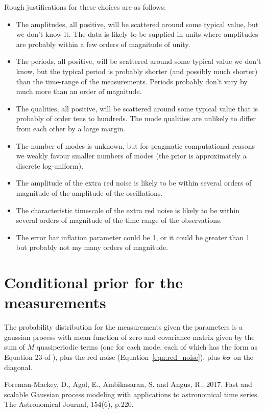 \documentclass[a4paper, 12pt]{article}
\begin{document}
Rough justifications for these choices are as follows:
\begin{itemize}
    \item The amplitudes, all positive, will be scattered around some typical
          value, but we don't know it. The data is likely to be supplied
          in units where amplitudes are probably
          within a few orders of magnitude of unity.
    \item The periods, all positive, will be scattered around some typical
          value we don't know, but the typical period is probably shorter
          (and possibly much shorter) than the time-range of the measurements.
          Periods probably don't vary by much more than an order of magnitude.
    \item The qualities, all positive, will be scattered around some typical
          value that is probably of order tens to hundreds. The mode qualities
          are unlikely to differ from each other by a large margin.
    \item The number of modes is unknown, but for pragmatic computational
          reasons we weakly favour smaller numbers of modes (the prior
          is approximately a discrete log-uniform).
    \item The amplitude of the extra red noise is likely to be within
          several orders of magnitude of the amplitude of the oscillations.
    \item The characteristic timescale of the extra red noise is likely to
          be within several orders of magnitude of the time range of the
          observations.
    \item The error bar inflation parameter could be 1, or it could be
          greater than 1 but probably not my many orders of magnitude.
\end{itemize}

\section{Conditional prior for the measurements}

The probability distribution for the measurements given the parameters is
a gaussian process with mean function of zero and covariance matrix given
by the sum of $M$ quasiperiodic terms (one for each mode, each of which
has the form as Equation 23 of \citet{celerite}), plus the red noise
(Equation~\ref{eqn:red_noise}), plus $k\boldsymbol{\sigma}$ on the diagonal.

\begin{thebibliography}{999}
Foreman-Mackey, D., Agol, E., Ambikasaran, S. and Angus, R., 2017. Fast and scalable Gaussian process modeling with applications to astronomical time series. The Astronomical Journal, 154(6), p.220.
\end{thebibliography}
\end{document}
